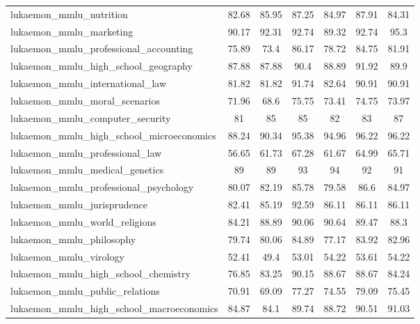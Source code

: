 \documentclass{article}
\begin{document}
\begin{table}[htp]
{\begin{tabular}{lcccc>{\columncolor{blue!10}}c>{\columncolor{blue!10}}c}
lukaemon\_mmlu\_nutrition                               & 82.68 & 85.95 & 87.25 & 84.97 & 87.91 & 84.31 \\
lukaemon\_mmlu\_marketing                               & 90.17 & 92.31 & 92.74 & 89.32 & 92.74 & 95.3  \\
lukaemon\_mmlu\_professional\_accounting                & 75.89 & 73.4  & 86.17 & 78.72 & 84.75 & 81.91 \\
lukaemon\_mmlu\_high\_school\_geography                 & 87.88 & 87.88 & 90.4  & 88.89 & 91.92 & 89.9  \\
lukaemon\_mmlu\_international\_law                      & 81.82 & 81.82 & 91.74 & 82.64 & 90.91 & 90.91 \\
lukaemon\_mmlu\_moral\_scenarios                        & 71.96 & 68.6  & 75.75 & 73.41 & 74.75 & 73.97 \\
lukaemon\_mmlu\_computer\_security                      & 81    & 85    & 85    & 82    & 83    & 87    \\
lukaemon\_mmlu\_high\_school\_microeconomics            & 88.24 & 90.34 & 95.38 & 94.96 & 96.22 & 96.22 \\
lukaemon\_mmlu\_professional\_law                       & 56.65 & 61.73 & 67.28 & 61.67 & 64.99 & 65.71 \\
lukaemon\_mmlu\_medical\_genetics                       & 89    & 89    & 93    & 94    & 92    & 91    \\
lukaemon\_mmlu\_professional\_psychology                & 80.07 & 82.19 & 85.78 & 79.58 & 86.6  & 84.97 \\
lukaemon\_mmlu\_jurisprudence                           & 82.41 & 85.19 & 92.59 & 86.11 & 86.11 & 86.11 \\
lukaemon\_mmlu\_world\_religions                        & 84.21 & 88.89 & 90.06 & 90.64 & 89.47 & 88.3  \\
lukaemon\_mmlu\_philosophy                              & 79.74 & 80.06 & 84.89 & 77.17 & 83.92 & 82.96 \\
lukaemon\_mmlu\_virology                                & 52.41 & 49.4  & 53.01 & 54.22 & 53.61 & 54.22 \\
lukaemon\_mmlu\_high\_school\_chemistry                 & 76.85 & 83.25 & 90.15 & 88.67 & 88.67 & 84.24 \\
lukaemon\_mmlu\_public\_relations                       & 70.91 & 69.09 & 77.27 & 74.55 & 79.09 & 75.45 \\
lukaemon\_mmlu\_high\_school\_macroeconomics            & 84.87 & 84.1  & 89.74 & 88.72 & 90.51 & 91.03 \\

\end{tabular}}
\end{table}
\end{document}
